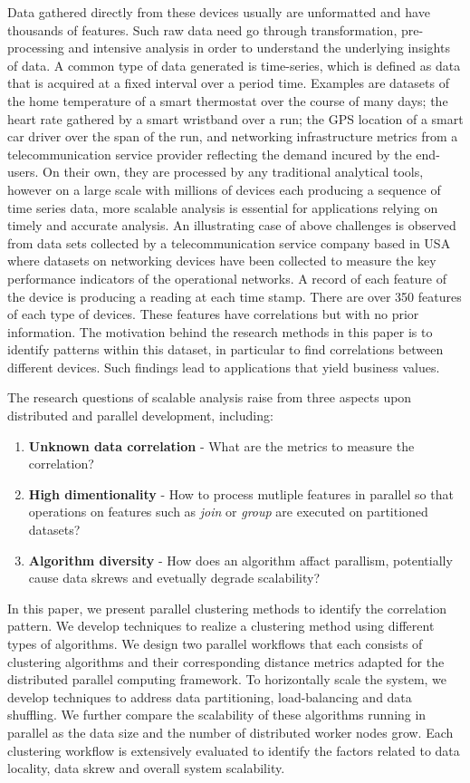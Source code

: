 Data gathered directly from these devices usually are unformatted and have thousands of features. Such raw data need go through transformation, pre-processing and intensive analysis in order to understand the underlying insights of data. A common type of data generated is time-series, which is defined as data that is acquired at a fixed interval over a period time. Examples are datasets of  the home temperature of a smart thermostat over the course of many days; the heart rate gathered by a smart wristband over a run; the GPS location of a smart car driver over the span of the run, and networking infrastructure metrics from a telecommunication service provider reflecting the demand incured by the end-users. On their own, they are processed by any traditional analytical tools, however on a large scale with millions of devices each producing a sequence of time series data, more scalable analysis is essential for applications relying on timely and accurate analysis. An illustrating case of above challenges is observed from data sets collected by a telecommunication service company based in USA where datasets on networking devices have been collected to measure the key performance indicators of the operational networks. A record of each feature of the device is producing a reading at each time stamp. There are over 350 features of each type of devices. These features have correlations but with no prior information. The motivation behind the research methods in this paper is to identify patterns within this dataset, in particular to find correlations between different devices. Such findings lead to applications that yield business values.

The research questions of scalable analysis raise from three aspects upon distributed and parallel development, including: 

\begin{enumerate}
	\item \textbf{Unknown data correlation} - What are the metrics to measure the correlation? 
	\item \textbf{High dimentionality} - How to process mutliple features in parallel so that operations on features such as \textit{join} or \textit{group} are executed on partitioned datasets?
	\item \textbf{Algorithm diversity} - How does an algorithm affact parallism, potentially cause data skrews and evetually degrade scalability? 
\end{enumerate}

In this paper, we present parallel clustering methods to identify the correlation pattern. We develop techniques to realize a clustering method using different types of algorithms. We design two parallel workflows that each consists of clustering algorithms and their corresponding distance metrics adapted for the distributed parallel computing framework. To horizontally scale the system, we develop techniques  to address data partitioning, load-balancing and data shuffling. We further compare the scalability of these algorithms running in parallel as the data size and the number of distributed worker nodes grow. Each clustering workflow is extensively evaluated to identify the factors related to data locality, data skrew and overall system scalability.  								


